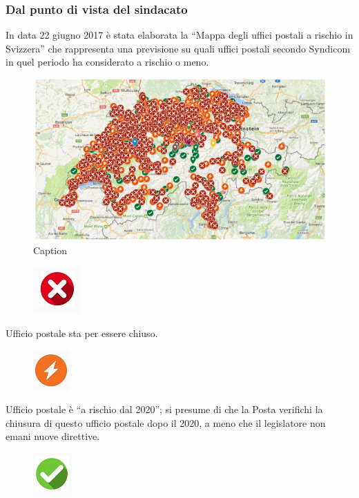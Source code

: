 \subsubsection{Dal punto di vista del sindacato}
In data 22 giugno 2017 è stata elaborata la “Mappa degli uffici postali a rischio in Svizzera” che rappresenta una previsione su quali uffici postali secondo Syndicom in quel periodo ha considerato a rischio o meno. 
\begin{figure}
    \centering
    \includegraphics{Mappa uffici postali a rischio.PNG}
    \caption{Caption}
    \label{fig:my_label}
\end{figure}
\begin{figure}
    \centering
    \includegraphics{sta per essere chiuso.PNG}
    \label{fig:my_label}
\end{figure}
Ufficio postale sta per essere chiuso.
\begin{figure}
    \centering
    \includegraphics{a rischio dal 2020.PNG}
    \label{fig:my_label}
\end{figure}
Ufficio postale è “a rischio dal 2020”; 
si presume di che la Posta verifichi 
la chiusura di questo ufficio postale 
dopo il 2020, a meno che il legislatore 
non emani nuove direttive.
\begin{figure}
    \centering
    \includegraphics{garantito a medio termine.PNG}
    \label{fig:my_label}
\end{figure}
